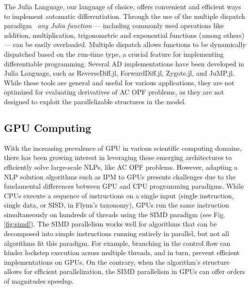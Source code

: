 The Julia Language, our language of choice, offers convenient and
efficient ways to implement automatic differentiation. Through the use
of the multiple dispatch paradigm~\cite{bezanson2017julia} \textit{any Julia function} ---
including commonly used operations like addition, multiplication,
trigonometric and exponential functions (among others) --- can be easily
overloaded. Multiple dispatch allows functions to be dynamically
dispatched based on the run-time type, a crucial feature for
implementing differentiable programming. Several AD implementations
have been developed in Julia Language, such as ReverseDiff.jl,
ForwardDiff.jl, Zygote.jl, and JuMP.jl. While these tools are general
and useful for various applications, they are not optimized for
evaluating derivatives of AC OPF problems, as they are not designed to
exploit the parallelizable structures in the model.


\subsection{GPU Computing}\label{sec:gpu}
With the increasing prevalence of GPU in various scientific computing
domains, there has been growing interest in leveraging these emerging
architectures to efficiently solve large-scale NLPs, like AC OPF problems.
However, adapting a NLP solution algorithms
such as IPM to GPUs presents challenges due to the fundamental
differences between GPU and CPU programming paradigms. While CPUs
execute a sequence of instructions on a single input (single
instruction, single data, or SISD, in Flynn's taxonomy), GPUs run the
same instruction simultaneously on hundreds of threads using the SIMD
paradigm (see Fig. \ref{fig:simd}). The SIMD parallelism works well
for algorithms that can be decomposed into simple instructions running
entirely in parallel, but not all algorithms fit this
paradigm. For example, branching in the control flow can hinder
lockstep execution across multiple threads, and in turn, prevent
efficient implementations on GPUs. On the contrary, when the
algorithm's structure allows for efficient parallelization, the SIMD
parallelism in GPUs can offer orders of magnitudes speedup.

